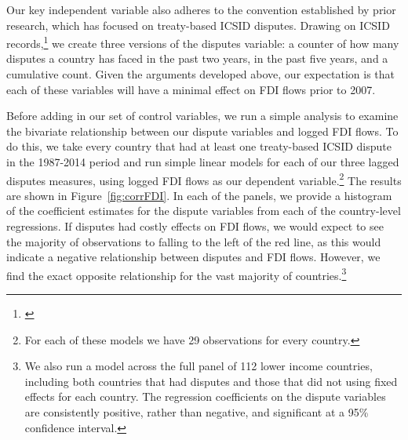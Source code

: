 \documentclass[12pt,onesided]{amsart}
\begin{document}
\nocite{icsid:2014}
Our key independent variable also adheres to the convention established by prior research, which has focused on treaty-based ICSID disputes. Drawing on ICSID records,\footnote{\citet[7, 10]{icsid:2015}} we create three versions of the disputes variable: a counter of how many disputes a country has faced in the past two years, in the past five years, and a cumulative count. Given the arguments developed above, our expectation is that each of these variables will have a minimal effect on FDI flows prior to 2007.


Before adding in our set of control variables, we run a simple analysis to examine the bivariate relationship between our dispute variables and logged FDI flows. To do this, we take every country that had at least one treaty-based ICSID dispute in the 1987-2014 period and run simple linear models for each of our three lagged disputes measures, using logged FDI flows as our dependent variable.\footnote{For each of these models we have 29 observations for every country.} The results are shown in Figure~\ref{fig:corrFDI}. In each of the panels, we provide a histogram of the coefficient estimates for the dispute variables from each of the country-level regressions. If disputes had costly effects on FDI flows, we would expect to see the majority of observations to falling to the left of the red line, as this would indicate a negative relationship between disputes and FDI flows. However, we find the exact opposite relationship for the vast majority of countries.\footnote{We also run a model across the full panel of 112 lower income countries, including both countries that had disputes and those that did not using fixed effects for each country. The regression coefficients on the dispute variables are consistently positive, rather than negative, and significant at a 95\% confidence interval.}
\end{document}
